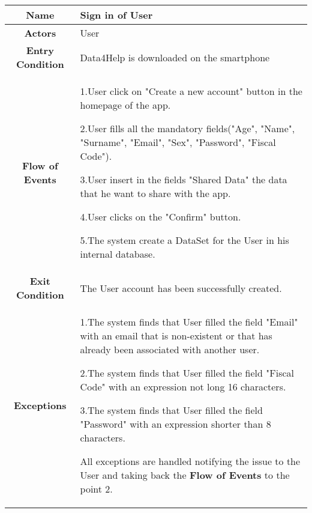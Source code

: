      \begin{table}[h!]
   \centering
    \begin{tabularx}{\linewidth}{|c|X|}
         \hline
         \textbf{Name} & Sign in of User\\
	\hline
	\textbf{Actors} & User \\
	\hline
	\textbf{Entry Condition} & Data4Help is downloaded on the smartphone \\
	\hline
	\textbf{Flow of Events} & 1.User click on "Create a new account" button in the homepage of the app.

					2.User fills all the mandatory fields("Age", "Name", "Surname", "Email", "Sex", "Password", "Fiscal 							Code").

					3.User insert in the fields "Shared Data" the data that he want to share with the app.

					4.User clicks on the "Confirm" button.

					5.The system create a DataSet for the User in his internal database.\\
	\hline
	\textbf{Exit Condition} & The User account has been successfully created. \\
	\hline
	\textbf{Exceptions} & 
					1.The system finds that User filled the field "Email"  with an email that is non-existent or that has 							already been associated with another user.

					2.The system finds that User filled the field "Fiscal Code" with an expression not long 16 								characters.

					3.The system finds that User filled the field "Password" with an expression shorter than 8 								characters.

					All exceptions are handled notifying the issue to the User and taking back the \textbf{Flow of 							Events} to the point 2.\\
        \hline
      \end{tabularx}        
      \end{table}

